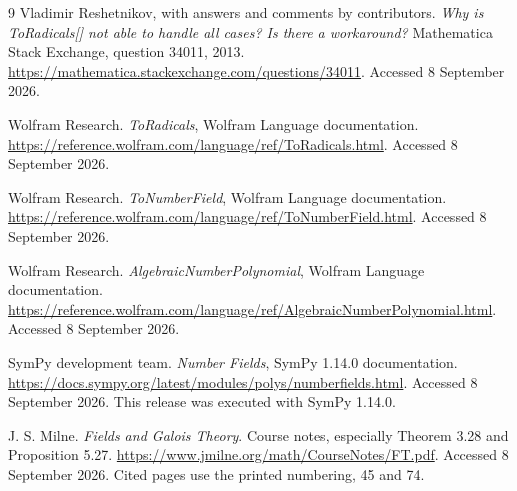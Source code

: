 \documentclass[11pt,letterpaper]{article}
\theoremstyle{definition}\newtheorem{definition}[theorem]{Definition}
\theoremstyle{remark}\newtheorem{remark}[theorem]{Remark}
\begin{document}
\clearpage
\begin{thebibliography}{9}
Vladimir Reshetnikov, with answers and comments by contributors.
\emph{Why is ToRadicals[] not able to handle all cases? Is there a workaround?}
Mathematica Stack Exchange, question 34011, 2013.
\url{https://mathematica.stackexchange.com/questions/34011}.
Accessed 8 September 2026.

Wolfram Research. \emph{ToRadicals}, Wolfram Language documentation.
\url{https://reference.wolfram.com/language/ref/ToRadicals.html}.
Accessed 8 September 2026.

Wolfram Research. \emph{ToNumberField}, Wolfram Language documentation.
\url{https://reference.wolfram.com/language/ref/ToNumberField.html}.
Accessed 8 September 2026.

Wolfram Research. \emph{AlgebraicNumberPolynomial}, Wolfram Language documentation.
\url{https://reference.wolfram.com/language/ref/AlgebraicNumberPolynomial.html}.
Accessed 8 September 2026.

SymPy development team. \emph{Number Fields}, SymPy 1.14.0 documentation.
\url{https://docs.sympy.org/latest/modules/polys/numberfields.html}.
Accessed 8 September 2026. This release was executed with SymPy 1.14.0.

J. S. Milne. \emph{Fields and Galois Theory}.
Course notes, especially Theorem 3.28 and Proposition 5.27.
\url{https://www.jmilne.org/math/CourseNotes/FT.pdf}.
Accessed 8 September 2026. Cited pages use the printed numbering, 45 and 74.
\end{thebibliography}
\end{document}
